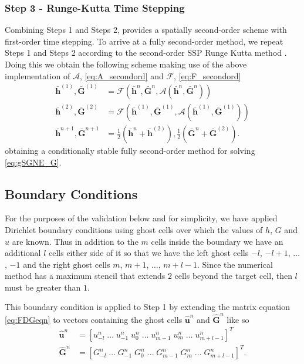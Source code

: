 \documentclass[10pt]{elsarticle}
\newcommand{\vecn}[1]{\boldsymbol{#1}}
\begin{document}
\subsubsection{Step 3 - Runge-Kutta Time Stepping}
Combining Steps 1 and Steps 2, provides a spatially second-order scheme with first-order time stepping. To arrive at a fully second-order method, we repeat Steps 1 and Steps 2 according to the second-order SSP Runge Kutta method \cite{Gottlieb-etal-2003-89}. Doing this we obtain the following scheme making use of the above implementation of $\mathcal{A}$, \eqref{eq:A_secondord} and $\mathcal{F}$, \eqref{eq:F_secondord}
\begin{align*}
\bar{\vecn{h}}^{(1)},\bar{\vecn{G}}^{(1)} &= \mathcal{F}\left(\bar{\vecn{h}}^n,\bar{\vecn{G}}^n,\mathcal{A}\left(\bar{\vecn{h}}^n,\bar{\vecn{G}}^n\right) \right) \\
\bar{\vecn{h}}^{(2)},\bar{\vecn{G}}^{(2)} &= \mathcal{F}\left(\bar{\vecn{h}}^{(1)},\bar{\vecn{G}}^{(1)},\mathcal{A}\left(\bar{\vecn{h}}^{(1)},\bar{\vecn{G}}^{(1)}\right) \right)\\
\bar{\vecn{h}}^{n+1},\bar{\vecn{G}}^{n+1} &= \frac{1}{2}\left(\bar{\vecn{h}}^n + \bar{\vecn{h}}^{(2)} \right) ,  \frac{1}{2}\left(\bar{\vecn{G}}^n + \bar{\vecn{G}}^{(2)} \right). 
\end{align*}
obtaining a conditionally stable fully second-order method for solving \eqref{eq:gSGNE_G}. 

\subsection{Boundary Conditions}
For the purposes of the validation below and for simplicity, we have applied Dirichlet boundary conditions using ghost cells over which the values of $h$, $G$ and $u$ are known. Thus in addition to the $m$ cells inside the boundary we have an additional $l$ cells either side of it so that we have the left ghost cells $-l$, $-l + 1$, $\dots$, $-1$ and the right ghost cells $m$, $m+1$, $\dots$, $m + l -1$. Since the numerical method has a maximum stencil that extends $2$ cells beyond the target cell, then $l$ must be greater than $1$. 

This boundary condition is applied to Step 1 by extending the matrix equation \eqref{eq:FDGeqn} to vectors containing the ghost cells $\vecn{\hat{u}}^n$ and $\vecn{\hat{G}}^n$ like so
\begin{align*}
\vecn{\hat{u}}^n &= \left[u^n_{-l} \; \dots \; u^n_{-1} \; u^n_{0}\; \dots \; u^n_{m-1}\; u^n_{m} \; \dots \; u^n_{m + l -1}   \right]^T \\
\vecn{\hat{G}}^n &= \left[G^n_{-l} \; \dots \; G^n_{-1} \; G^n_{0}\; \dots \; G^n_{m-1}\; G^n_{m} \; \dots \; G^n_{m + l -1}   \right]^T.
\end{align*}
\end{document}
